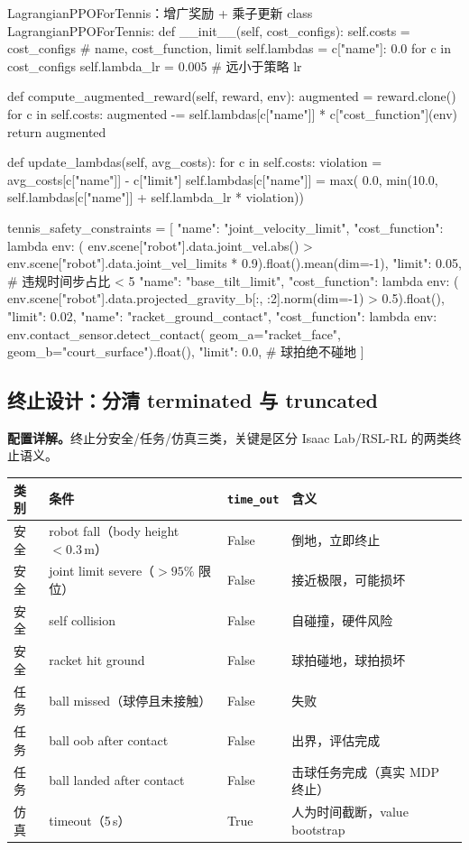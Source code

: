 \begin{codebox}[Python]{LagrangianPPOForTennis：增广奖励 + 乘子更新}
class LagrangianPPOForTennis:
    def __init__(self, cost_configs):
        self.costs = cost_configs                       # name, cost_function, limit
        self.lambdas = {c["name"]: 0.0 for c in cost_configs}
        self.lambda_lr = 0.005                          # 远小于策略 lr

    def compute_augmented_reward(self, reward, env):
        augmented = reward.clone()
        for c in self.costs:
            augmented -= self.lambdas[c["name"]] * c["cost_function"](env)
        return augmented

    def update_lambdas(self, avg_costs):
        for c in self.costs:
            violation = avg_costs[c["name"]] - c["limit"]
            self.lambdas[c["name"]] = max(
                0.0, min(10.0, self.lambdas[c["name"]] + self.lambda_lr * violation))

tennis_safety_constraints = [
    {"name": "joint_velocity_limit",
     "cost_function": lambda env: (
         env.scene["robot"].data.joint_vel.abs()
         > env.scene["robot"].data.joint_vel_limits * 0.9).float().mean(dim=-1),
     "limit": 0.05},   # 违规时间步占比 < 5%
    {"name": "base_tilt_limit",
     "cost_function": lambda env: (
         env.scene["robot"].data.projected_gravity_b[:, :2].norm(dim=-1) > 0.5).float(),
     "limit": 0.02},
    {"name": "racket_ground_contact",
     "cost_function": lambda env: env.contact_sensor.detect_contact(
         geom_a="racket_face", geom_b="court_surface").float(),
     "limit": 0.0},    # 球拍绝不碰地
]
\end{codebox}

\subsection{终止设计：分清 terminated 与 truncated}

\textbf{配置详解。}终止分安全/任务/仿真三类，关键是区分 Isaac Lab/RSL-RL 的两类终止语义。

\begin{center}
\small
\begin{tabular}{@{}llll@{}}
\toprule
类别 & 条件 & \verb|time_out| & 含义 \\
\midrule
安全 & robot fall（body height $<0.3$\,m） & False & 倒地，立即终止 \\
安全 & joint limit severe（$>95\%$ 限位） & False & 接近极限，可能损坏 \\
安全 & self collision & False & 自碰撞，硬件风险 \\
安全 & racket hit ground & False & 球拍碰地，球拍损坏 \\
任务 & ball missed（球停且未接触） & False & 失败 \\
任务 & ball oob after contact & False & 出界，评估完成 \\
任务 & ball landed after contact & False & 击球任务完成（真实 MDP 终止） \\
仿真 & timeout（5\,s） & True & 人为时间截断，value bootstrap \\
\bottomrule
\end{tabular}
\end{center}

